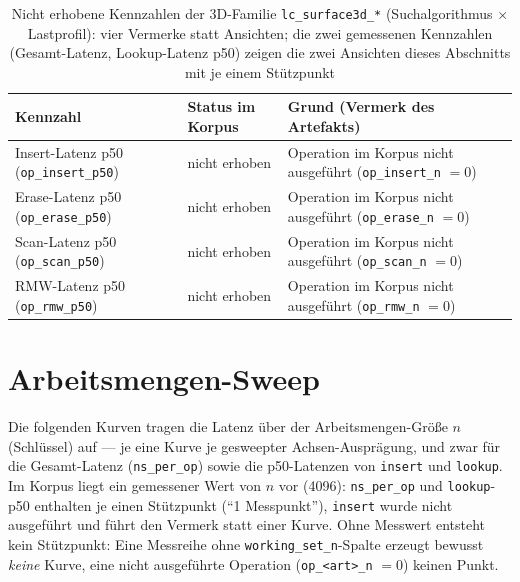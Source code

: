 \begin{table}[!htbp]
\centering
\small
\begin{tabular}{@{}>{\raggedright\arraybackslash}p{4.4cm}>{\raggedright\arraybackslash}p{3.0cm}>{\raggedright\arraybackslash}p{7.0cm}@{}}
\toprule
Kennzahl & Status im Korpus & Grund (Vermerk des Artefakts) \\
\midrule
Insert-Latenz p50 (\texttt{op\_insert\_p50}) & nicht erhoben & Operation im Korpus nicht ausgeführt (\texttt{op\_insert\_n} $= 0$) \\
Erase-Latenz p50 (\texttt{op\_erase\_p50}) & nicht erhoben & Operation im Korpus nicht ausgeführt (\texttt{op\_erase\_n} $= 0$) \\
Scan-Latenz p50 (\texttt{op\_scan\_p50}) & nicht erhoben & Operation im Korpus nicht ausgeführt (\texttt{op\_scan\_n} $= 0$) \\
RMW-Latenz p50 (\texttt{op\_rmw\_p50}) & nicht erhoben & Operation im Korpus nicht ausgeführt (\texttt{op\_rmw\_n} $= 0$) \\
\bottomrule
\end{tabular}
\caption{Nicht erhobene Kennzahlen der 3D-Familie \texttt{lc\_surface3d\_*} (Suchalgorithmus $\times$
Lastprofil): vier Vermerke statt Ansichten; die zwei gemessenen Kennzahlen (Gesamt-Latenz, Lookup-Latenz
p50) zeigen die zwei Ansichten dieses Abschnitts mit je einem Stützpunkt}%
\label{tab:t3:surfaces3d}
\end{table}
\fi

\section{Arbeitsmengen-Sweep}\label{sec:measurements:working-set-sweep}

Die folgenden Kurven tragen die Latenz über der Arbeitsmengen-Größe $n$ (Schlüssel) auf --- je eine
Kurve je gesweepter Achsen-Ausprägung, und zwar für die Gesamt-Latenz (\texttt{ns\_per\_op}) sowie
die p50-Latenzen von \texttt{insert} und \texttt{lookup}. Im Korpus liegt ein gemessener Wert von $n$
vor (4096): \texttt{ns\_per\_op} und \texttt{lookup}-p50 enthalten je einen Stützpunkt
(\enquote{1 Messpunkt}), \texttt{insert} wurde nicht ausgeführt und führt den Vermerk statt einer
Kurve. Ohne Messwert entsteht kein Stützpunkt: Eine Messreihe ohne \texttt{working\_set\_n}-Spalte erzeugt
bewusst \emph{keine} Kurve, eine nicht ausgeführte Operation (\texttt{op\_<art>\_n} $= 0$) keinen
Punkt.

